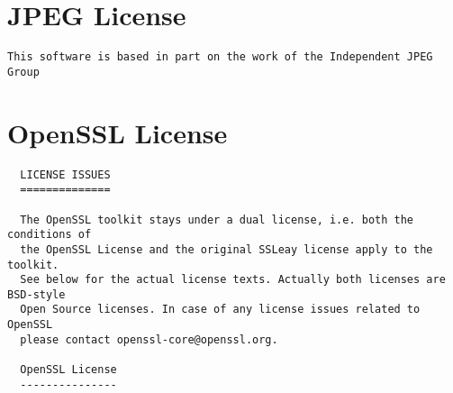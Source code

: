 \section{JPEG License}
\label{webots.jpeglicense}%

\begin{lstlisting}
This software is based in part on the work of the Independent JPEG Group
\end{lstlisting}
\section{OpenSSL License}
\label{webots.openssllicense}%

\begin{lstlisting}
  LICENSE ISSUES
  ==============

  The OpenSSL toolkit stays under a dual license, i.e. both the conditions of
  the OpenSSL License and the original SSLeay license apply to the toolkit.
  See below for the actual license texts. Actually both licenses are BSD-style
  Open Source licenses. In case of any license issues related to OpenSSL
  please contact openssl-core@openssl.org.

  OpenSSL License
  ---------------


\end{lstlisting}
